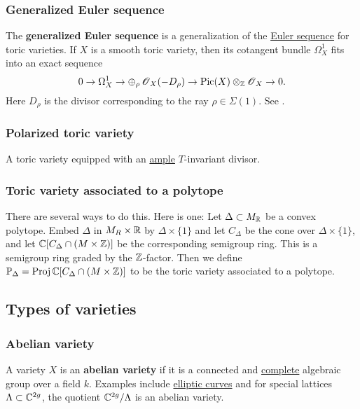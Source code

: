 \documentclass[11pt, english]{article}
\begin{document}
\subsubsection{Generalized Euler sequence}
\label{toriceulerseq}

The \textbf{generalized Euler sequence} is a generalization of the \hyperref[eulersequence]{Euler sequence} for toric varieties. If $X$ is a smooth toric variety, then its cotangent bundle $\Omega_X^1$ fits into an exact sequence
\[
0 \to \Omega_X^1 \to \oplus_\rho \operatorname{\mathscr{O}}_X(-D_\rho) \to \operatorname{Pic}(X) \otimes_{\mathbb{Z}} \operatorname{\mathscr{O}}_X \to 0.
\]
Here $D_\rho$ is the divisor corresponding to the ray $\rho \in \Sigma(1)$. See \cite[Chapter 8]{cox_toric}. 

\subsubsection{Polarized toric variety}
A toric variety equipped with an \hyperref[amplelinebundle]{ample} $T$-invariant divisor.

\subsubsection{Toric variety associated to a polytope}

There are several ways to do this. Here is one: Let $\Delta \subset M_{\mathbb{R}}$ be a convex polytope. Embed $\Delta$ in $M_R \times \mathbb{R}$ by $\Delta \times \{1\}$ and let $C_\Delta$ be the cone over $\Delta \times \{ 1\}$, and let $\mathbb{C}[C_\Delta \cap (M \times \mathbb{Z})]$ be the corresponding semigroup ring. This is a semigroup ring graded by the $\mathbb{Z}$-factor. Then we define $\mathbb{P}_\Delta=\operatorname{Proj} \mathbb{C}[C_\Delta \cap (M \times \mathbb{Z})]$ to be the toric variety associated to a polytope.

\subsection{Types of varieties}
\subsubsection{Abelian variety}
\label{abelianvar}

A variety $X$ is an \textbf{abelian variety} if it is a connected and \hyperref[completevariety]{complete} algebraic group over a field $k$. Examples include \hyperref[ellipticc]{elliptic curves} and for special lattices $\Lambda \subset \mathbb{C}^{2g}$, the quotient $\mathbb{C}^{2g}/\Lambda$ is an abelian variety.
\end{document}
